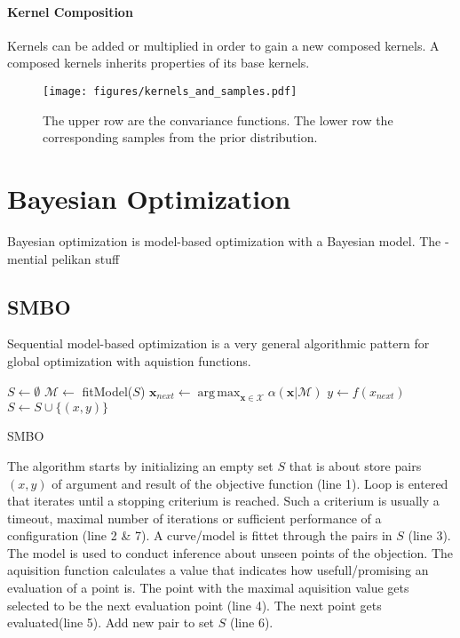 \documentclass[english]{article}
\newcommand{\x}{\mathbf{x}}
\newcommand{\M}{\mathcal{M}}
\newcommand{\X}{\mathcal{X}}
\DeclareMathOperator*{\argmax}{arg\,max}
\begin{document}
\paragraph{Kernel Composition}
Kernels can be added or multiplied in order to gain a new composed kernels. A composed kernels inherits properties of its base kernels.

\begin{figure}
  \texttt{[image: figures/kernels\_and\_samples.pdf]}
  \caption{The upper row are the convariance functions. The lower row the corresponding samples from the prior distribution.}
  \label{kernels_and_samples}
\end{figure}




\section{Bayesian Optimization}
Bayesian optimization is model-based optimization with a Bayesian model. The
- mential pelikan stuff

\subsection{SMBO}
Sequential model-based optimization is a very general algorithmic pattern for global optimization with aquistion functions.

\begin{algorithm}[H]
\SetAlgoLined

$S \leftarrow \emptyset$\;
{
  $\mathcal{M} \leftarrow$ fitModel($S$)\;
  $\x_{next} \leftarrow \argmax_{\x \in \X} \alpha(\x|\M)$\;
  $y \leftarrow f(x_{next})$\;
  $S \leftarrow S \cup \{(x,y)\}$\;
}
\caption{SMBO}
\end{algorithm}

The algorithm starts by initializing an empty set $S$ that is about store pairs $(x,y)$ of argument and result of the objective function (line 1). Loop is entered that iterates until a stopping criterium is reached. Such a criterium is usually a timeout, maximal number of iterations or sufficient performance of a configuration (line 2 \& 7). A curve/model is fittet through the pairs in $S$ (line 3). The model is used to conduct inference about unseen points of the objection. The aquisition function calculates a value that indicates how usefull/promising an evaluation of a point is. The point with the maximal aquisition value gets selected to be the next evaluation point (line 4). The next point gets evaluated(line 5). Add new pair to set $S$ (line 6).
\end{document}
